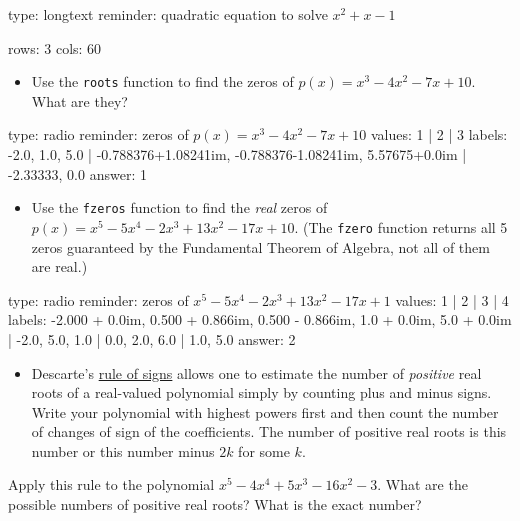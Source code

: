\documentclass[12pt]{article}
\begin{document}
\begin{answer}
type: longtext
reminder: quadratic equation to solve \(x^2 + x - 1\)

rows: 3
cols: 60
\end{answer}

\begin{itemize}
\itemsep1pt\parskip0pt
\item
  Use the \texttt{roots} function to find the zeros of
  $p(x)=x^3 -4x^2 -7x + 10$. What are they?
\end{itemize}

\begin{answer}
type: radio
reminder: zeros of \(p(x)=x^3 -4x^2 -7x + 10\)
values: 1 | 2 | 3
labels: -2.0, 1.0, 5.0 | -0.788376+1.08241im,  -0.788376-1.08241im, 5.57675+0.0im | -2.33333, 0.0
answer: 1
\end{answer}

\begin{itemize}
\itemsep1pt\parskip0pt
\item
  Use the \texttt{fzeros} function to find the \emph{real} zeros of
  $p(x) = x^5 -5x^4 -2x^3 + 13x^2 -17x + 10$. (The \texttt{fzero}
  function returns all 5 zeros guaranteed by the Fundamental Theorem of
  Algebra, not all of them are real.)
\end{itemize}

\begin{answer}
type: radio
reminder: zeros of \( x^5-5x^4 -2x^3 + 13x^2 -17x + 1\)
values: 1 | 2 | 3 | 4
labels: -2.000 + 0.0im, 0.500 + 0.866im, 0.500 - 0.866im, 1.0 + 0.0im, 5.0 + 0.0im | -2.0, 5.0, 1.0 | 0.0, 2.0, 6.0 | 1.0, 5.0
answer: 2
\end{answer}

\begin{itemize}
\itemsep1pt\parskip0pt
\item
  Descarte's
  \href{http://en.wikipedia.org/wiki/Descartes_rule_of_signs}{rule of
  signs} allows one to estimate the number of \emph{positive} real roots
  of a real-valued polynomial simply by counting plus and minus signs.
  Write your polynomial with highest powers first and then count the
  number of changes of sign of the coefficients. The number of positive
  real roots is this number or this number minus $2k$ for some $k$.
\end{itemize}

Apply this rule to the polynomial $x^5 - 4x^4 + 5x^3 - 16x^2 -   3$.
What are the possible numbers of positive real roots? What is the exact
number?
\end{document}
